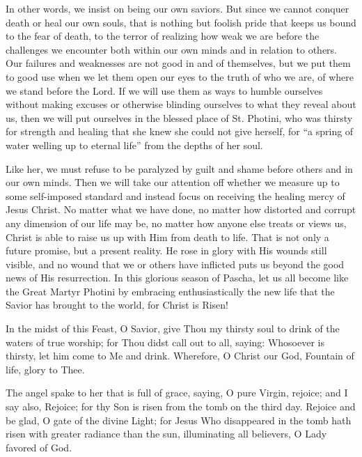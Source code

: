 \documentclass[twoside, letterpaper, 12pt]{report}
\begin{document}
\begin{maybetwocolumns}
In other words, we insist on being our own saviors. But since we cannot conquer death or heal our
own souls, that is nothing but foolish pride that keeps us bound to the fear of death, to the terror
of realizing how weak we are before the challenges we encounter both within our own minds and
in relation to others. Our failures and weaknesses are not good in and of themselves, but we put
them to good use when we let them open our eyes to the truth of who we are, of where we stand
before the Lord. If we will use them as ways to humble ourselves without making excuses or
otherwise blinding ourselves to what they reveal about us, then we will put ourselves in the blessed
place of St. Photini, who was thirsty for strength and healing that she knew she could not give
herself, for “a spring of water welling up to eternal life” from the depths of her soul.

Like her, we must refuse to be paralyzed by guilt and shame before others and in our own minds.
Then we will take our attention off whether we measure up to some self-imposed standard and
instead focus on receiving the healing mercy of Jesus Christ. No matter what we have done, no
matter how distorted and corrupt any dimension of our life may be, no matter how anyone else
treats or views us, Christ is able to raise us up with Him from death to life. That is not only a
future promise, but a present reality. He rose in glory with His wounds still visible, and no wound
that we or others have inflicted puts us beyond the good news of His resurrection. In this glorious
season of Pascha, let us all become like the Great Martyr Photini by embracing enthusiastically
the new life that the Savior has brought to the world, for Christ is Risen!
\end{maybetwocolumns}


In the midst of this Feast, O Savior, give Thou my thirsty soul to drink of the waters of true
worship; for Thou didst call out to all, saying: Whosoever is thirsty, let him come to Me and drink.
Wherefore, O Christ our God, Fountain of life, glory to Thee.

The angel spake to her that is full of grace, saying, O pure Virgin, rejoice; and I say also, Rejoice;
for thy Son is risen from the tomb on the third day.
Rejoice and be glad, O gate of the divine Light; for Jesus Who disappeared in the tomb hath risen
with greater radiance than the sun, illuminating all believers, O Lady favored of God.

\readerline{\throughtheprayers}

\end{document}
